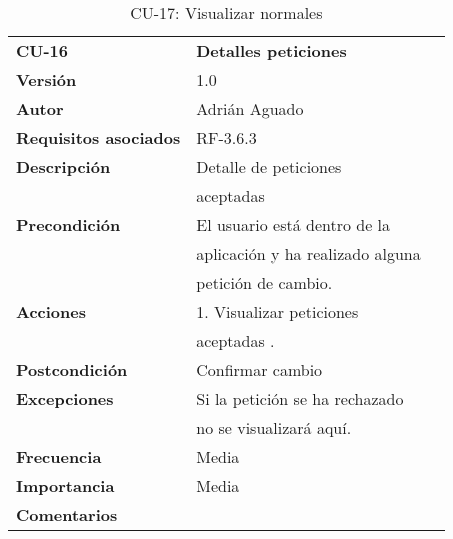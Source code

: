 \begin{table}
\begin{tabular}{llr}  
\toprule
\begin{minipage}[b]{0.24\columnwidth}\raggedright\strut
\textbf{CU-16}\strut
\end{minipage} & \begin{minipage}[b]{0.72\columnwidth}\raggedright\strut
\textbf{Detalles peticiones}\strut
\end{minipage}\tabularnewline
\cmidrule(r){1-2}
\textbf{Versión}       & 1.0           \\
\textbf{Autor}       & Adrián  Aguado    \\
\textbf{Requisitos asociados}       & RF-3.6.3  \\
\textbf{Descripción} & Detalle de peticiones \\
& aceptadas\\
\textbf{Precondición}  & El usuario está dentro de la \\
& aplicación y ha realizado alguna  \\
& petición de cambio.  \\
\textbf{Acciones} & 1. Visualizar peticiones\\
& aceptadas . \\
\textbf{Postcondición} &  Confirmar cambio \\
\textbf{Excepciones} &  Si la petición se ha rechazado   \\
&  no se visualizará aquí.   \\
\textbf{Frecuencia} & Media          \\
\textbf{Importancia} & Media           \\
\textbf{Comentarios } &   \\
\bottomrule
\end{tabular}
\caption{CU-17: Visualizar normales} 
\end{table}

